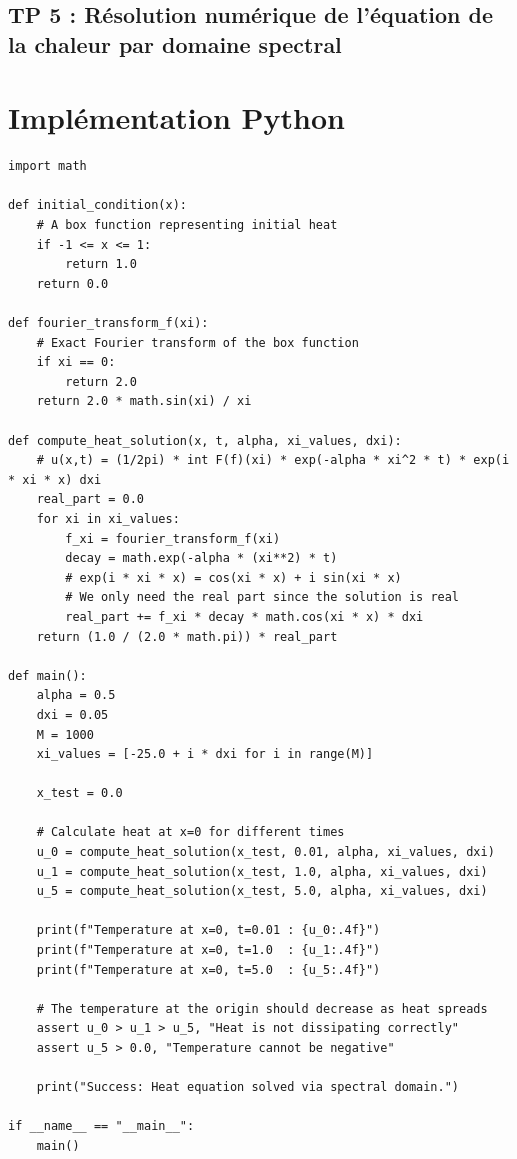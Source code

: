 \documentclass[11pt,a4paper]{article}
\begin{document}
\subsection*{TP 5 : Résolution numérique de l'équation de la chaleur par domaine spectral}

\section{Implémentation Python}

\begin{lstlisting}
import math

def initial_condition(x):
    # A box function representing initial heat
    if -1 <= x <= 1:
        return 1.0
    return 0.0

def fourier_transform_f(xi):
    # Exact Fourier transform of the box function
    if xi == 0:
        return 2.0
    return 2.0 * math.sin(xi) / xi

def compute_heat_solution(x, t, alpha, xi_values, dxi):
    # u(x,t) = (1/2pi) * int F(f)(xi) * exp(-alpha * xi^2 * t) * exp(i * xi * x) dxi
    real_part = 0.0
    for xi in xi_values:
        f_xi = fourier_transform_f(xi)
        decay = math.exp(-alpha * (xi**2) * t)
        # exp(i * xi * x) = cos(xi * x) + i sin(xi * x)
        # We only need the real part since the solution is real
        real_part += f_xi * decay * math.cos(xi * x) * dxi
    return (1.0 / (2.0 * math.pi)) * real_part

def main():
    alpha = 0.5
    dxi = 0.05
    M = 1000
    xi_values = [-25.0 + i * dxi for i in range(M)]

    x_test = 0.0

    # Calculate heat at x=0 for different times
    u_0 = compute_heat_solution(x_test, 0.01, alpha, xi_values, dxi)
    u_1 = compute_heat_solution(x_test, 1.0, alpha, xi_values, dxi)
    u_5 = compute_heat_solution(x_test, 5.0, alpha, xi_values, dxi)

    print(f"Temperature at x=0, t=0.01 : {u_0:.4f}")
    print(f"Temperature at x=0, t=1.0  : {u_1:.4f}")
    print(f"Temperature at x=0, t=5.0  : {u_5:.4f}")

    # The temperature at the origin should decrease as heat spreads
    assert u_0 > u_1 > u_5, "Heat is not dissipating correctly"
    assert u_5 > 0.0, "Temperature cannot be negative"

    print("Success: Heat equation solved via spectral domain.")

if __name__ == "__main__":
    main()
\end{lstlisting}
\end{document}
